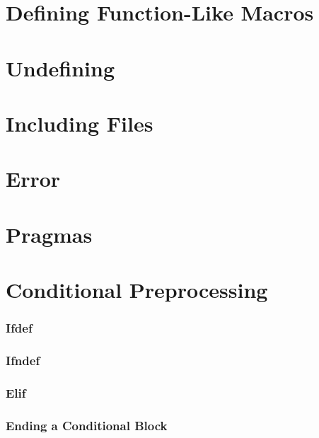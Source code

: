 \section{Defining Function-Like Macros}

\section{Undefining}

\section{Including Files}

\section{Error}

\section{Pragmas}

\section{Conditional Preprocessing}

\subsubsection{Ifdef}
\subsubsection{Ifndef}
\subsubsection{Elif}

\subsubsection{Ending a Conditional Block}


